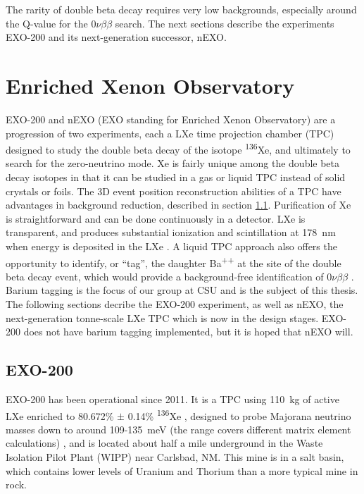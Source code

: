 The rarity of double beta decay requires very low backgrounds, especially around the Q-value for the $0\nu\beta\beta$ search. The next sections describe the experiments EXO-200 and its next-generation successor, nEXO.

\section{Enriched Xenon Observatory}

EXO-200 and nEXO (EXO standing for Enriched Xenon Observatory) are a progression of two experiments, each a LXe time projection chamber (TPC) designed to study the double beta decay of the isotope \textsuperscript{136}Xe, and ultimately to search for the zero-neutrino mode.  Xe is fairly unique among the double beta decay isotopes in that it can be studied in a gas or liquid TPC instead of solid crystals or foils.  The 3D event position reconstruction abilities of a TPC have advantages in background reduction, described in section \ref{subsec:EXO200}.  Purification of Xe is straightforward and can be done continuously in a detector.  LXe is transparent, and produces substantial ionization and scintillation at 178~nm when energy is deposited in the LXe \cite{EXO200TwoNuLong}.  A liquid TPC approach also offers the opportunity to identify, or ``tag'', the daughter Ba\textsuperscript{++} at the site of the double beta decay event, which would provide a background-free identification of $0\nu\beta\beta$ \cite{Moe1991}. Barium tagging is the focus of our group at CSU and is the subject of this thesis.  The following sections decribe the EXO-200 experiment, as well as nEXO, the next-generation tonne-scale LXe TPC which is now in the design stages.  EXO-200 does not have barium tagging implemented, but it is hoped that nEXO will. 

\subsection{EXO-200}
\label{subsec:EXO200}

EXO-200 has been operational since 2011.  It is a TPC using 110~kg of active LXe enriched to 80.672\% $\pm$ 0.14\% \textsuperscript{136}Xe \cite{EXO200TwoNuLong},  designed to probe Majorana neutrino masses down to around 109-135~meV (the range covers different matrix element calculations) \cite{EXO200instrumentationPart1}, and is located about half a mile underground in the Waste Isolation Pilot Plant (WIPP) near Carlsbad, NM.  This mine is in a salt basin, which contains lower levels of Uranium and Thorium than a more typical mine in rock.

